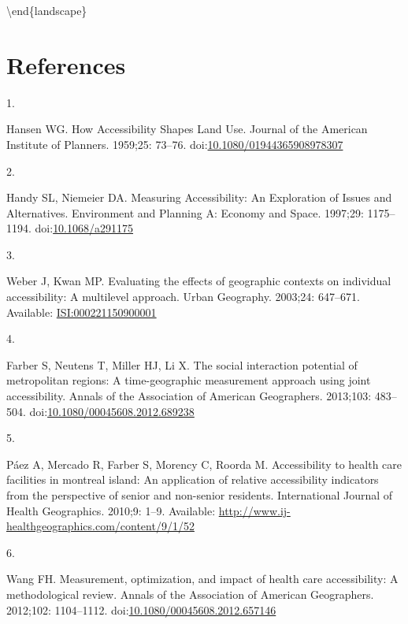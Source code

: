\documentclass[10pt,letterpaper]{article}
\newlength{\cslhangindent}
\newlength{\csllabelwidth}
\newlength{\cslentryspacingunit} %
\newenvironment{CSLReferences}[2] %
 {%
  \setlength{\parindent}{0pt}
  \ifodd #1
  \let\oldpar\par
  \def\par{\hangindent=\cslhangindent\oldpar}
  \fi
  \setlength{\parskip}{#2\cslentryspacingunit}
 }%
 {}
\newcommand{\CSLLeftMargin}[1]{\parbox[t]{\csllabelwidth}{#1}}
\newcommand{\CSLRightInline}[1]{\parbox[t]{\linewidth - \csllabelwidth}{#1}\break}
\begin{document}
\textbackslash end\{landscape\}

\section{References}

\hypertarget{refs}{}
\begin{CSLReferences}{0}{0}
\leavevmode{}%
\CSLLeftMargin{1. }%
\CSLRightInline{Hansen WG. How Accessibility Shapes Land Use. Journal of
the American Institute of Planners. 1959;25: 73--76.
doi:\href{https://doi.org/10.1080/01944365908978307}{10.1080/01944365908978307}}

\leavevmode{}%
\CSLLeftMargin{2. }%
\CSLRightInline{Handy SL, Niemeier DA. Measuring {Accessibility}: {An}
{Exploration} of {Issues} and {Alternatives}. Environment and Planning
A: Economy and Space. 1997;29: 1175--1194.
doi:\href{https://doi.org/10.1068/a291175}{10.1068/a291175}}

\leavevmode{}%
\CSLLeftMargin{3. }%
\CSLRightInline{Weber J, Kwan MP. Evaluating the effects of geographic
contexts on individual accessibility: A multilevel approach. Urban
Geography. 2003;24: 647--671. Available:
\href{https://ISI:000221150900001}{ISI:000221150900001}}

\leavevmode{}%
\CSLLeftMargin{4. }%
\CSLRightInline{Farber S, Neutens T, Miller HJ, Li X. The social
interaction potential of metropolitan regions: A time-geographic
measurement approach using joint accessibility. Annals of the
Association of American Geographers. 2013;103: 483--504.
doi:\href{https://doi.org/10.1080/00045608.2012.689238}{10.1080/00045608.2012.689238}}

\leavevmode{}%
\CSLLeftMargin{5. }%
\CSLRightInline{Páez A, Mercado R, Farber S, Morency C, Roorda M.
Accessibility to health care facilities in montreal island: An
application of relative accessibility indicators from the perspective of
senior and non-senior residents. International Journal of Health
Geographics. 2010;9: 1--9. Available:
\url{http://www.ij-healthgeographics.com/content/9/1/52}}

\leavevmode{}%
\CSLLeftMargin{6. }%
\CSLRightInline{Wang FH. Measurement, optimization, and impact of health
care accessibility: A methodological review. Annals of the Association
of American Geographers. 2012;102: 1104--1112.
doi:\href{https://doi.org/10.1080/00045608.2012.657146}{10.1080/00045608.2012.657146}}


\end{CSLReferences}
\end{document}
